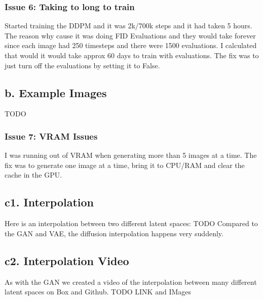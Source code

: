 \documentclass{article}
\begin{document}
\subsubsection*{Issue 6: Taking to long to train}
Started training the DDPM and it was 2k/700k steps and it had taken 5 hours.
The reason why cause it was doing FID Evaluations and they would take forever
since each image had 250 timesteps and there were 1500 evaluations.
I calculated that would it would take approx 60 days to train with evaluations. The fix was to
just turn off the evaluations by setting it to False.

\subsection*{b. Example Images}
TODO

\subsubsection*{Issue 7: VRAM Issues}
I was running out of VRAM when generating more than 5 images at a time. The fix was to
generate one image at a time, bring it to CPU/RAM and clear the cache in the GPU.

\subsection*{c1. Interpolation}
Here is an interpolation between two different latent spaces:
TODO
Compared to the GAN and VAE, the diffusion interpolation happens very suddenly.

\subsection*{c2. Interpolation Video}
As with the GAN we created a video of the interpolation between many different latent spaces on Box and Github.
TODO LINK and IMages
\end{document}
